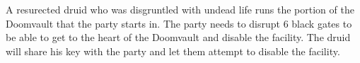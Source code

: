 A resurected druid who was disgruntled with undead life runs the portion of the Doomvault that the party starts in.
The party needs to disrupt 6 black gates to be able to get to the heart of the Doomvault and disable the facility.
The druid will share his key with the party and let them attempt to disable the facility.